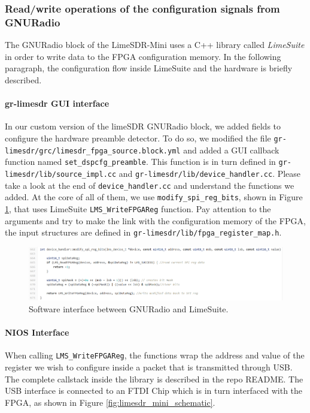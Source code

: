 \subsubsection{Read/write operations of the configuration signals from GNURadio}
The GNURadio block of the LimeSDR-Mini uses a C++ library called \textit{LimeSuite} in order to write data to the FPGA configuration memory. In the following paragraph, the configuration flow inside LimeSuite and the hardware is briefly described.

\begin{sloppypar}
\paragraph{gr-limesdr GUI interface}
In our custom version of the limeSDR GNURadio block, we added fields to configure the hardware preamble detector. To do so, we modified the file \texttt{gr-limesdr/grc/limesdr\_fpga\_source.block.yml} and added a GUI callback function named \texttt{set\_dspcfg\_preamble}. This function is in turn defined in \texttt{gr-limesdr/lib/source\_impl.cc} and \texttt{gr-limesdr/lib/device\_handler.cc}. Please take a look at the end of \texttt{device\_handler.cc} and understand the functions we added. At the core of all of them, we use \texttt{modify\_spi\_reg\_bits}, shown in Figure \ref{fig:modify_spi_reg_bits}, that uses LimeSuite \texttt{LMS\_WriteFPGAReg} function. Pay attention to the arguments and try to make the link with the configuration memory of the FPGA, the input structures are defined in \texttt{gr-limesdr/lib/fpga\_register\_map.h}.
\end{sloppypar}

\begin{figure}[!h]
    \centering
    \includegraphics[width=\linewidth]{figures/grlimesdr_write_fpgacfg.PNG}
    \caption{Software interface between GNURadio and LimeSuite.}
    \label{fig:modify_spi_reg_bits}
\end{figure}

\paragraph{NIOS Interface}
When calling \texttt{LMS\_WriteFPGAReg}, the functions wrap the address and value of the register we wish to configure inside a packet that is transmitted through USB. The complete callstack inside the library is described in the repo README. The USB interface is connected to an FTDI Chip which is in turn interfaced with the FPGA, as shown in Figure \ref{fig:limesdr_mini_schematic}.

